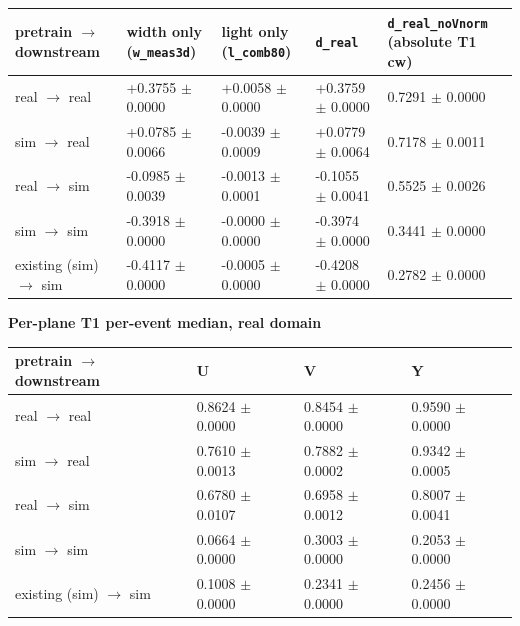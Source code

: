 \documentclass[10pt,a4paper]{article}
\begin{document}
\begin{center}\footnotesize
\setlength{\tabcolsep}{3pt}\renewcommand{\arraystretch}{1.15}
\begin{tabularx}{\linewidth}{LLLLL}
\toprule
\textbf{pretrain $\rightarrow$ downstream} & \textbf{width only (\texttt{w\_\allowbreak{}meas3d})} & \textbf{light only (\texttt{l\_\allowbreak{}comb80})} & \textbf{\texttt{d\_\allowbreak{}real}} & \textbf{\texttt{d\_\allowbreak{}real\_\allowbreak{}noVnorm} (absolute T1 cw)} \\
\midrule
real $\rightarrow$ real & +0.3755 $\pm$ 0.0000 & +0.0058 $\pm$ 0.0000 & +0.3759 $\pm$ 0.0000 & 0.7291 $\pm$ 0.0000 \\
sim $\rightarrow$ real & +0.0785 $\pm$ 0.0066 & -0.0039 $\pm$ 0.0009 & +0.0779 $\pm$ 0.0064 & 0.7178 $\pm$ 0.0011 \\
real $\rightarrow$ sim & -0.0985 $\pm$ 0.0039 & -0.0013 $\pm$ 0.0001 & -0.1055 $\pm$ 0.0041 & 0.5525 $\pm$ 0.0026 \\
sim $\rightarrow$ sim & -0.3918 $\pm$ 0.0000 & -0.0000 $\pm$ 0.0000 & -0.3974 $\pm$ 0.0000 & 0.3441 $\pm$ 0.0000 \\
existing (sim) $\rightarrow$ sim & -0.4117 $\pm$ 0.0000 & -0.0005 $\pm$ 0.0000 & -0.4208 $\pm$ 0.0000 & 0.2782 $\pm$ 0.0000 \\
\bottomrule
\end{tabularx}
\end{center}
\textbf{Per-plane T1 per-event median, real domain}

\begin{center}\small
\setlength{\tabcolsep}{3pt}\renewcommand{\arraystretch}{1.15}
\begin{tabularx}{\linewidth}{LLLL}
\toprule
\textbf{pretrain $\rightarrow$ downstream} & \textbf{U} & \textbf{V} & \textbf{Y} \\
\midrule
real $\rightarrow$ real & 0.8624 $\pm$ 0.0000 & 0.8454 $\pm$ 0.0000 & 0.9590 $\pm$ 0.0000 \\
sim $\rightarrow$ real & 0.7610 $\pm$ 0.0013 & 0.7882 $\pm$ 0.0002 & 0.9342 $\pm$ 0.0005 \\
real $\rightarrow$ sim & 0.6780 $\pm$ 0.0107 & 0.6958 $\pm$ 0.0012 & 0.8007 $\pm$ 0.0041 \\
sim $\rightarrow$ sim & 0.0664 $\pm$ 0.0000 & 0.3003 $\pm$ 0.0000 & 0.2053 $\pm$ 0.0000 \\
existing (sim) $\rightarrow$ sim & 0.1008 $\pm$ 0.0000 & 0.2341 $\pm$ 0.0000 & 0.2456 $\pm$ 0.0000 \\
\bottomrule
\end{tabularx}
\end{center}
\end{document}
